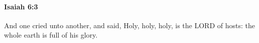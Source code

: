 
		\paragraph{Isaiah 6:3} %
			\label{ISAIAH-6-3}

			And one cried unto another, and said, Holy, holy, holy, is the LORD of hosts: the whole earth is full of his glory.


